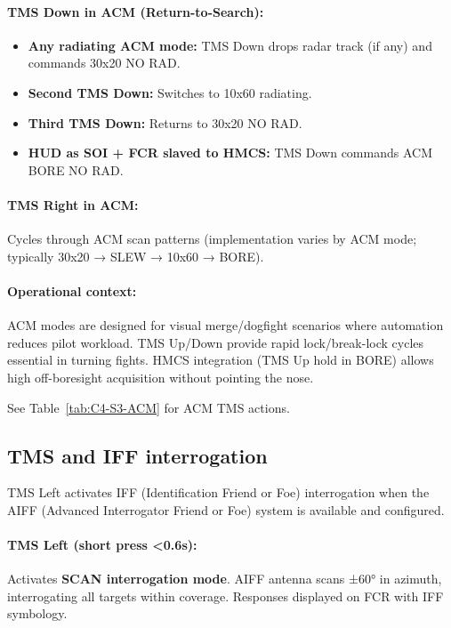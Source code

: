 \documentclass[11pt, a4paper, twoside]{report}
\begin{document}
\paragraph{TMS Down in ACM (Return-to-Search):}
\begin{itemize}
    \item \textbf{Any radiating ACM mode:} TMS Down drops radar track (if any) and commands 30x20 NO RAD.
    \item \textbf{Second TMS Down:} Switches to 10x60 radiating.
    \item \textbf{Third TMS Down:} Returns to 30x20 NO RAD.
    \item \textbf{HUD as SOI + FCR slaved to HMCS:} TMS Down commands ACM BORE NO RAD.
\end{itemize}

\paragraph{TMS Right in ACM:}
Cycles through ACM scan patterns (implementation varies by ACM mode; typically 30x20 → SLEW → 10x60 → BORE).

\paragraph{Operational context:}
ACM modes are designed for visual merge/dogfight scenarios where automation reduces pilot workload. TMS Up/Down provide rapid lock/break-lock cycles essential in turning fights. HMCS integration (TMS Up hold in BORE) allows high off-boresight acquisition without pointing the nose.

See Table~\ref{tab:C4-S3-ACM} for ACM TMS actions.

\subsection{TMS and IFF interrogation}
\label{sec:C4-S3-S5}

TMS Left activates IFF (Identification Friend or Foe) interrogation when the AIFF (Advanced Interrogator Friend or Foe) system is available and configured.

\paragraph{TMS Left (short press <0.6s):}
Activates \textbf{SCAN interrogation mode}. AIFF antenna scans ±60° in azimuth, interrogating all targets within coverage. Responses displayed on FCR with IFF symbology.
\end{document}
